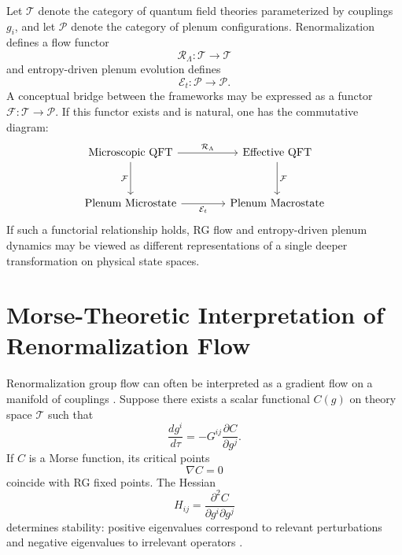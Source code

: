 \documentclass[12pt,a4paper]{article}
\theoremstyle{plain}
\theoremstyle{definition}
\theoremstyle{remark}
\begin{document}
Let $\mathcal{T}$ denote the category of quantum field theories
parameterized by couplings $g_i$, and let $\mathcal{P}$ denote the
category of plenum configurations. Renormalization defines a flow
functor
\begin{equation}
\mathcal{R}_\Lambda : \mathcal{T} \rightarrow \mathcal{T}
\end{equation}
and entropy-driven plenum evolution defines
\begin{equation}
\mathcal{E}_t : \mathcal{P} \rightarrow \mathcal{P}.
\end{equation}
A conceptual bridge between the frameworks may be expressed as a
functor $\mathcal{F} : \mathcal{T} \rightarrow \mathcal{P}$. If this
functor exists and is natural, one has the commutative diagram:
\[
\begin{tikzcd}[column sep=4em, row sep=3em]
\text{Microscopic QFT}
  \arrow[r,"\mathcal{R}_\Lambda"]
  \arrow[d,"\mathcal{F}"']
&
\text{Effective QFT}
  \arrow[d,"\mathcal{F}"]
\\
\text{Plenum Microstate}
  \arrow[r,"\mathcal{E}_t"']
&
\text{Plenum Macrostate}
\end{tikzcd}
\]
If such a functorial relationship holds, RG flow and entropy-driven
plenum dynamics may be viewed as different representations of a single
deeper transformation on physical state spaces.

\section{Morse-Theoretic Interpretation of Renormalization Flow}

Renormalization group flow can often be interpreted as a gradient flow
on a manifold of couplings \cite{Zamolodchikov1986,PannellStergiou2025}.
Suppose there exists a scalar functional $C(g)$ on theory space
$\mathcal{T}$ such that
\begin{equation}
\frac{d g^i}{d\tau} = -G^{ij}\frac{\partial C}{\partial g^j}.
\end{equation}
If $C$ is a Morse function, its critical points
\begin{equation}
\nabla C = 0
\end{equation}
coincide with RG fixed points. The Hessian
\begin{equation}
H_{ij} = \frac{\partial^2 C}{\partial g^i \partial g^j}
\end{equation}
determines stability: positive eigenvalues correspond to relevant
perturbations and negative eigenvalues to irrelevant operators
\cite{Cardy1996}.
\end{document}
